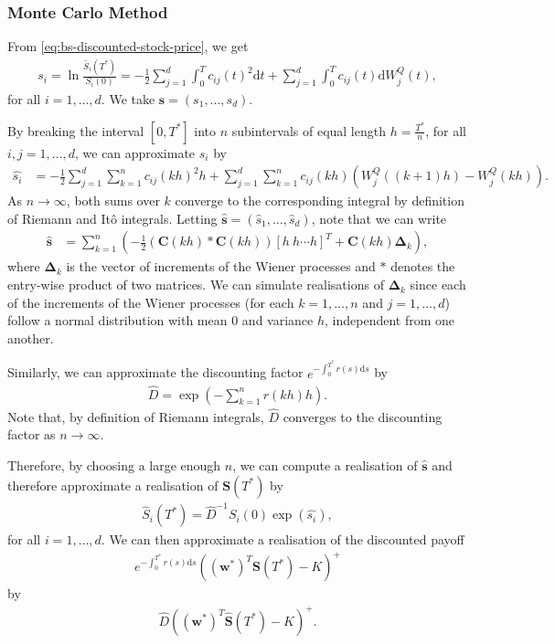 \documentclass[english]{article}
\numberwithin{equation}{section}
\numberwithin{figure}{section}
\theoremstyle{bolddescit}
\theoremstyle{definition}
\theoremstyle{definition}
\theoremstyle{plain}
\theoremstyle{plain}
\theoremstyle{bolddesc}
\theoremstyle{plain}
\theoremstyle{remark}
\begin{document}
\subsubsection{Monte Carlo Method}

From \eqref{eq:bs-discounted-stock-price}, we get
\begin{align*}
  s_i = \ln \frac{\widetilde{S_i}(T^*)}{S_i(0)} = - \frac{1}{2} \sum_{j=1}^{d} \int_0^T c_{ij}(t)^2 \mathrm{d}t + \sum_{j=1}^{d} \int_0^T c_{ij}(t) \mathrm{d}W^Q_j(t),
\end{align*}
for all $i=1,\ldots,d$. We take $\mathbf{s} = (s_1,\ldots,s_d)$.

By breaking the interval $[0,T^*]$ into $n$ subintervals of equal length $h = \frac{T^*}{n}$, for all $i,j=1,\ldots,d$, we can approximate $s_i$ by
\begin{align*}
  \hat{s_i} &= - \frac{1}{2} \sum_{j=1}^{d} \sum_{k=1}^{n} c_{ij}(kh)^2 h + \sum_{j=1}^{d} \sum_{k=1}^{n}  c_{ij}(kh) (W^Q_j((k+1)h) - W^Q_j(kh)).
\end{align*}
As $n \to \infty$, both sums over $k$ converge to the corresponding integral by definition of Riemann and It\^o integrals. Letting $\hat{\mathbf{s}} = (\hat{s}_1,\ldots,\hat{s}_d)$, note that we can write
\begin{align*}
  \hat{\mathbf{s}} &= \sum_{k=1}^{n} \left( - \frac{1}{2} (\mathbf{C}(kh) * \mathbf{C}(kh)) [h\ h \cdots h]^T + \mathbf{C}(kh) \mathbf{\Delta}_k \right),
\end{align*}
where $\mathbf{\Delta}_k$ is the vector of increments of the Wiener processes and $*$ denotes the entry-wise product of two matrices. We can simulate realisations of $\mathbf{\Delta}_k$ since each of the increments of the Wiener processes (for each $k=1,\ldots,n$ and $j=1,\ldots,d$) follow a normal distribution with mean 0 and variance $h$, independent from one another.

Similarly, we can approximate the discounting factor $e^{-\int_0^{T^*} r(s) \mathrm{d}s}$ by
\begin{align*}
  \hat{D} = \exp \left(-\sum_{k=1}^{n} r(kh) h\right).
\end{align*}
Note that, by definition of Riemann integrals, $\hat{D}$ converges to the discounting factor as $n \to \infty$.

Therefore, by choosing a large enough $n$, we can compute a realisation of $\hat{\mathbf{s}}$ and therefore approximate a realisation of $\mathbf{S}(T^*)$ by
\begin{align*}
  \hat{S}_i(T^*) = \hat{D}^{-1} S_i(0) \exp\left(\hat{s_i}\right),
\end{align*}
for all $i=1,\ldots,d$. We can then approximate a realisation of the discounted payoff
\begin{align}\label{eq:monte-carlo-discounted-payoff}
  e^{-\int_0^{T^*} r(s) \mathrm{d}s} ((\mathbf{w}^*)^T \mathbf{S}(T^*) - K)^+
\end{align}
by
\begin{align*}
  \hat{D} ((\mathbf{w}^*)^T \hat{\mathbf{S}}(T^*) - K)^+.
\end{align*}
\end{document}

